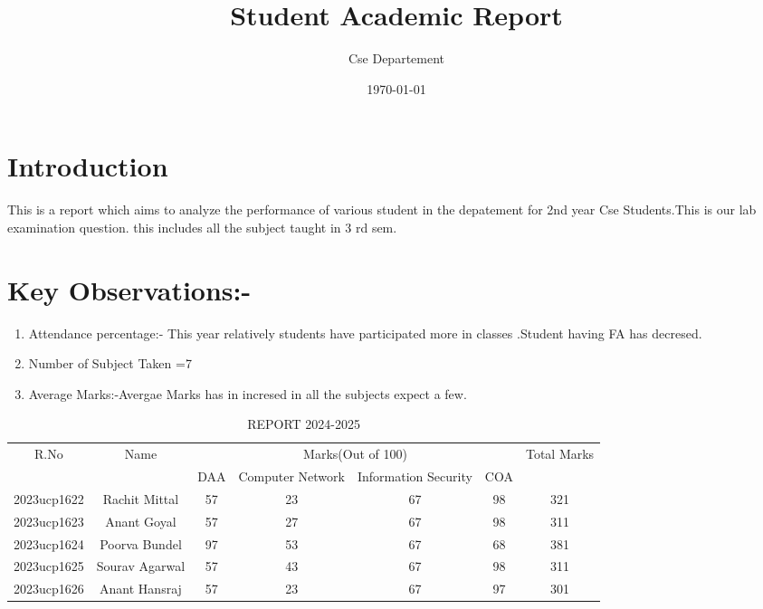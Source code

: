 \documentclass{article}
\title{\textbf{Student Academic Report}}
\author{Cse Departement}
\date{\today}
\begin{document}
\maketitle

\section{Introduction}
This is a report which aims to analyze the performance of various student in the depatement for 2nd year Cse Students.This is our lab examination question.
this includes all the subject taught in 3 rd sem.
\section{Key Observations:-}
\begin{enumerate}
    \item Attendance percentage:- This year relatively students have participated more in classes .Student having FA has decresed.\\
    \item Number of Subject Taken =7\\
    \item Average Marks:-Avergae Marks has in incresed in all the subjects expect a few. 
\end{enumerate}
\begin{table}[]
    \centering
    \begin{tabular}{|c|c|c|c|c|c|c|}
    \hline
         R.No & Name & \multicolumn{4}{|c|}{Marks(Out of 100)} & Total Marks\\
         \cline{3-6}
               &      & DAA & Computer Network & Information Security & COA & \\
        \hline
        2023ucp1622 & Rachit Mittal & 57 & 23 & 67 & 98 & 321\\
        \hline
        2023ucp1623 & Anant Goyal & 57 & 27 & 67 & 98 & 311\\
        \hline
        2023ucp1624 & Poorva Bundel & 97 & 53 & 67 & 68 & 381\\
        \hline
        2023ucp1625 & Sourav Agarwal & 57 & 43 & 67 & 98 & 311\\
        \hline
        2023ucp1626 & Anant Hansraj & 57 & 23 & 67 & 97 & 301\\
        \hline
         
    \end{tabular}
    \caption{REPORT 2024-2025}

\end{table}
\end{document}
